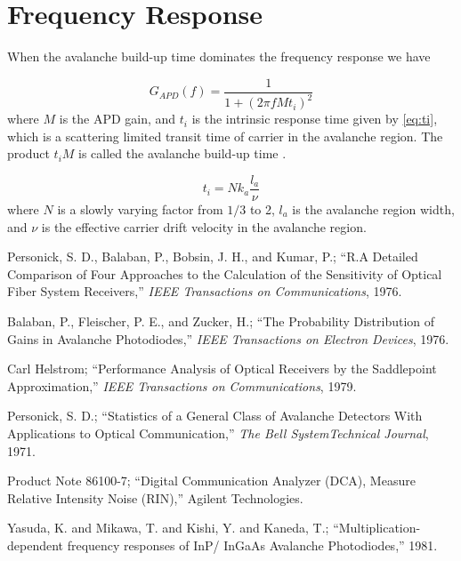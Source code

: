 \documentclass[a4paper]{article}
\begin{document}
\section{Frequency Response}

When the avalanche build-up time dominates the frequency response we have \cite{}

\begin{equation}
G_{APD}(f) = \frac{1}{1 + (2\pi fMt_i)^2}
\end{equation}
where $M$ is the APD gain, and $t_i$ is the intrinsic response time given by \eqref{eq:ti}, which is a scattering limited transit time of carrier in the avalanche region. The product $t_iM$ is called the avalanche build-up time \cite{frequency-reponse-InP-InGaAs}.

\begin{equation}
t_i = Nk_a\frac{l_a}{\nu}
\end{equation}
where $N$ is a slowly varying factor from $1/3$ to 2, $l_a$ is the avalanche region width, and $\nu$ is the effective carrier drift velocity in the avalanche region.

\begin{thebibliography}{9}
 Personick, S. D., Balaban, P., Bobsin, J. H., and Kumar, P.; ``R.A Detailed Comparison of Four Approaches to the Calculation of the Sensitivity of Optical Fiber System Receivers,'' \emph{IEEE Transactions on Communications}, 1976.

 Balaban, P., Fleischer, P. E., and Zucker, H.; ``The Probability Distribution of Gains in Avalanche Photodiodes,'' \emph{IEEE Transactions on Electron Devices}, 1976.

 Carl Helstrom; ``Performance Analysis of Optical Receivers by the Saddlepoint Approximation,'' \emph{IEEE Transactions on Communications}, 1979.

 Personick, S. D.; ``Statistics of a General Class of Avalanche Detectors With Applications to Optical Communication,'' \emph{The Bell SystemTechnical Journal}, 1971.

 Product Note 86100-7; ``Digital Communication Analyzer (DCA), Measure Relative Intensity Noise (RIN),'' Agilent Technologies. 

 Yasuda, K. and Mikawa, T. and Kishi, Y. and Kaneda, T.; ``Multiplication-dependent frequency responses of InP/ InGaAs Avalanche Photodiodes,'' 1981.



\end{thebibliography}
\end{document}
